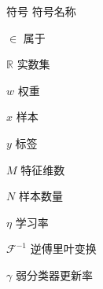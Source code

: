 \begin{symbollist}
\item [符号] \hspace{12em} {符号名称}
\item [$\in$]\hspace{12.5em} {属于}
\item [$\mathbb{R}$]\hspace{12.5em} {实数集}
\item [$w$] \hspace{12.5em} {权重}
\item [$x$] \hspace{12.5em} {样本}
\item [$y$] \hspace{12.5em} {标签}
\item [$M$] \hspace{12.5em} {特征维数}
\item [$N$] \hspace{12.5em} {样本数量}
\item [$\eta$] \hspace{12.5em} {学习率}
\item [$\mathcal{F}^{-1}$] \hspace{12.5em} {逆傅里叶变换}
\item [$\gamma$] \hspace{12.5em} {弱分类器更新率}
\end{symbollist}

